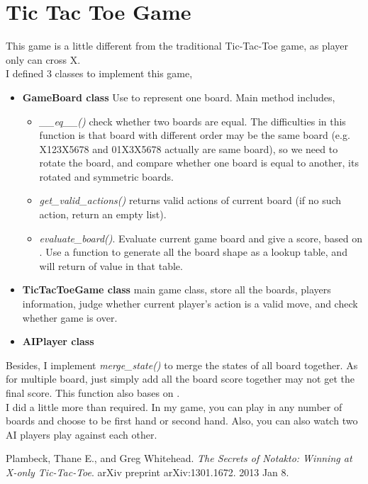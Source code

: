 \documentclass{article}
\begin{document}
	\section{Tic Tac Toe Game}
	\label{sec:Q6}
	This game is a little different from the traditional Tic-Tac-Toe game, as player only can cross X.\\
	I defined 3 classes to implement this game,
	\begin{itemize}
		\item \textbf{GameBoard class} Use to represent one board. Main method includes, 
		\begin{itemize}
			\item \textit{\_\_eq\_\_()} check whether two boards are equal. The difficulties in this function is that board with different order may be the same board (e.g. X123X5678 and 01X3X5678 actually are same board), so we need to rotate the board, and compare whether one board is equal to another, its rotated and symmetric boards.
			\item \textit{get\_valid\_actions()} returns valid actions of current board (if no such action, return an empty list).
			\item \textit{evaluate\_board()}. Evaluate current game board and give a score, based on \cite{winning_strategy}. Use a function to generate all the board shape as a lookup table, and will return of value in that table.
		\end{itemize}
		\item \textbf{TicTacToeGame class} main game class, store all the boards, players information, judge whether current player's action is a valid move, and check whether game is over.
		\item \textbf{AIPlayer class} 
	\end{itemize}
	Besides, I implement \textit{merge\_state()} to merge the states of all board together. As for multiple board, just simply add all the board score together may not get the final score. This function also bases on \cite{winning_strategy}.\\ 
	I did a little more than required. In my game, you can play in any number of boards and choose to be first hand or second hand. Also, you can also watch two AI players play against each other.
	\begin{thebibliography}{1}
		Plambeck, Thane E., and Greg Whitehead. 
		\textit{The Secrets of Notakto: Winning at X-only Tic-Tac-Toe}. 
		arXiv preprint arXiv:1301.1672. 2013 Jan 8.
	\end{thebibliography}
\end{document}
